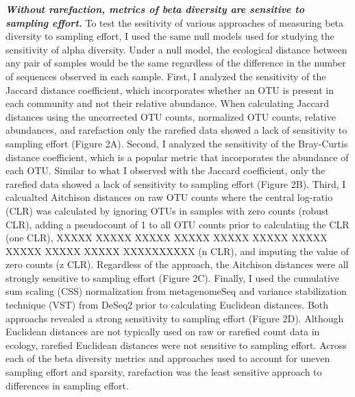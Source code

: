 \documentclass[
]{article}
\begin{document}
\textbf{\emph{Without rarefaction, metrics of beta diversity are
sensitive to sampling effort.}} To test the sesitivity of various
approaches of measuring beta diversity to sampling effort, I used the
same null models used for studying the sensitivity of alpha diversity.
Under a null model, the ecological distance between any pair of samples
would be the same regardless of the difference in the number of
sequences observed in each sample. First, I analyzed the sensitivity of
the Jaccard distance coefficient, which incorporates whether an OTU is
present in each community and not their relative abundance. When
calculating Jaccard distances using the uncorrected OTU counts,
normalized OTU counts, relative abundances, and rarefaction only the
rarefied data showed a lack of sensitivity to sampling effort (Figure
2A). Second, I analyzed the sensitivity of the Bray-Curtis distance
coefficient, which is a popular metric that incorporates the abundance
of each OTU. Similar to what I observed with the Jaccard coefficient,
only the rarefied data showed a lack of sensitivity to sampling effort
(Figure 2B). Third, I calcualted Aitchison distances on raw OTU counts
where the central log-ratio (CLR) was calculated by ignoring OTUs in
samples with zero counts (robust CLR), adding a pseudocount of 1 to all
OTU counts prior to calculating the CLR (one CLR), XXXXX XXXXX XXXXX
XXXXX XXXXX XXXXX XXXXX XXXXX XXXXX XXXXX XXXXXXXXXX (n CLR), and
imputing the value of zero counts (z CLR). Regardless of the approach,
the Aitchison distances were all strongly sensitive to sampling effort
(Figure 2C). Finally, I used the cumulative sum scaling (CSS)
normalization from metagenomeSeq and variance stabilization technique
(VST) from DeSeq2 prior to calculating Euclidean distances. Both
approachs revealed a strong sensitivity to sampling effort (Figure 2D).
Although Euclidean distances are not typically used on raw or rarefied
count data in ecology, rarefied Euclidean distances were not sensitive
to sampling effort. Across each of the beta diversity metrics and
approaches used to account for uneven sampling effort and sparsity,
rarefaction was the least sensitive approach to differences in sampling
effort.
\end{document}
